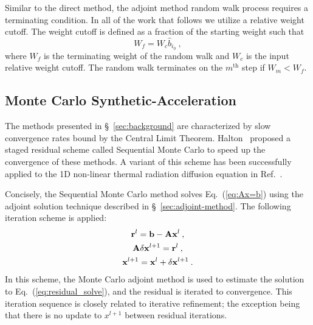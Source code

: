 Similar to the direct method, the adjoint method random walk process requires
a terminating condition.  In all of the work that follows we utilize a
relative weight cutoff.  The weight cutoff is defined as a fraction of the
starting weight such that
\begin{equation}
  W_f = W_c\hat{b}_{i_0}\:,
  \label{eq:weight_cutoff}
\end{equation}
where $W_f$ is the terminating weight of the random walk and $W_c$ is the
input relative weight cutoff. The random walk terminates on the $m^\text{th}$
step if $W_m < W_f$.


\subsection{Monte Carlo Synthetic-Acceleration}
\label{sec:iter-refin-monte}

The methods presented in \S~\ref{sec:background} are characterized by slow
convergence rates bound by the Central Limit Theorem.
Halton~\cite{halton_1962,halton_1994} proposed a staged residual scheme called
Sequential Monte Carlo to speed up the convergence of these methods.  A
variant of this scheme has been successfully applied to the 1D non-linear
thermal radiation diffusion equation in Ref.~\cite{evans_2003}.

Concisely, the Sequential Monte Carlo method solves Eq.~(\ref{eq:Ax=b}) using
the adjoint solution technique described in \S~\ref{sec:adjoint-method}.  The
following iteration scheme is applied:
\begin{subequations}
  \begin{gather}
    \mathbf{r}^{l} = \mathbf{b} - \mathbf{A}\mathbf{x}^{l}\:, \\
    \mathbf{A}\delta\mathbf{x}^{l+1} = \mathbf{r}^{l}\:, \label{eq:residual_solve}\\
    \mathbf{x}^{l+1} = \mathbf{x}^{l} + \delta\mathbf{x}^{l+1}\:.
  \end{gather}
\end{subequations}
In this scheme, the Monte Carlo adjoint method is used to estimate the
solution to Eq.~(\ref{eq:residual_solve}), and the residual is iterated to
convergence.  This iteration sequence is closely related to iterative
refinement; the exception being that there is no update to $x^{l+1}$
between residual iterations.

